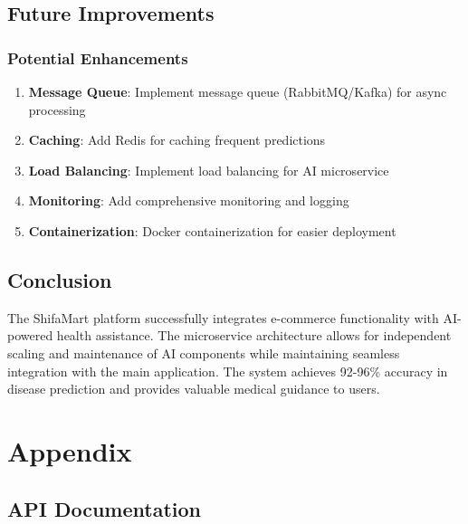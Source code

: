 \documentclass[12pt,a4paper]{article}
\begin{document}
\section{Future Improvements}
\subsection{Potential Enhancements}
\begin{enumerate}
    \item \textbf{Message Queue}: Implement message queue (RabbitMQ/Kafka) for async processing
    \item \textbf{Caching}: Add Redis for caching frequent predictions
    \item \textbf{Load Balancing}: Implement load balancing for AI microservice
    \item \textbf{Monitoring}: Add comprehensive monitoring and logging
    \item \textbf{Containerization}: Docker containerization for easier deployment
\end{enumerate}

\section{Conclusion}
The ShifaMart platform successfully integrates e-commerce functionality with AI-powered health assistance. The microservice architecture allows for independent scaling and maintenance of AI components while maintaining seamless integration with the main application. The system achieves 92-96\% accuracy in disease prediction and provides valuable medical guidance to users.






\appendix

\chapter{Appendix}

\section{API Documentation}
\end{document}
